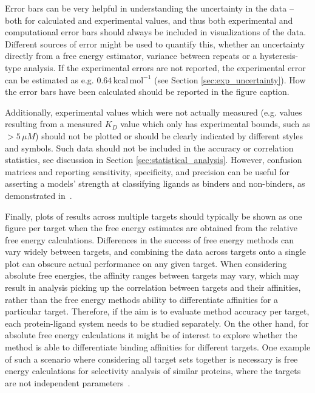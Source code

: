 \documentclass[9pt,bestpractices,pubversion]{livecoms}
\begin{document}
Error bars can be very helpful in understanding the uncertainty in the data -- both for calculated and experimental values, and thus both experimental and computational error bars should always be included in visualizations of the data. Different sources of error might be used to quantify this, whether an uncertainty directly from a free energy estimator, variance between repeats or a hysteresis-type analysis. If the experimental errors are not reported, the experimental error can be estimated as e.g. $0.64\,\mathrm{kcal\,mol^{-1}}$ (see Section \ref{sec:exp_uncertainty}). How the error bars have been calculated should be reported in the figure caption.


Additionally, experimental values which were not actually measured (e.g. values resulting from a measured $K_D$ value which only has experimental bounds, such as $> 5\,\mu M$) should not be plotted or should be clearly indicated by different styles and symbols. Such data should not be included in the accuracy or correlation statistics, see  discussion in Section \ref{sec:statistical_analysis}. However, confusion matrices and reporting sensitivity, specificity, and precision can be useful for asserting a models' strength at classifying ligands as binders and non-binders, as demonstrated in~\cite{hauserPredictingResistanceClinical2018}.

Finally, plots of results across multiple targets should typically be shown as one figure per target when the free energy estimates are obtained from the relative free energy calculations. Differences in the success of free energy methods can vary widely between targets, and combining the data across targets onto a single plot can obscure actual performance on any given target. When considering absolute free energies, the affinity ranges between targets may vary, which may result in analysis picking up the correlation between targets and their affinities, rather than the free energy methods ability to differentiate affinities for a particular target. Therefore, if the aim is to evaluate method accuracy per target, each protein-ligand system needs to be studied separately. On the other hand, for absolute free energy calculations it might be of interest to explore whether the method is able to differentiate binding affinities for different targets. One example of such a scenario where considering all target sets together is necessary is free energy calculations for selectivity analysis of similar proteins, where the targets are not independent parameters~\cite{aldeghiPredictionsLigandSelectivity2017}.
\end{document}
